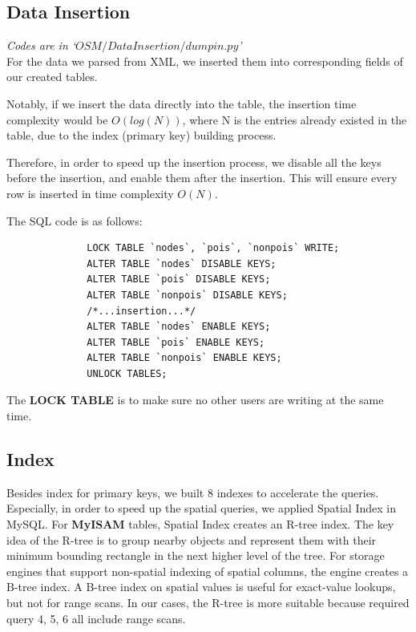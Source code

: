 \documentclass[final,1p,times]{elsarticle}
\begin{document}
\subsection{Data Insertion}
\emph{Codes are in `$OSM/DataInsertion/dumpin.py$'}\\

For the data we parsed from XML, we inserted them into corresponding fields of our created tables.

Notably, if we insert the data directly into the table, the insertion time complexity would be $O(log(N))$, where N is the entries already existed in the table, due to the index (primary key) building process.

Therefore, in order to speed up the insertion process, we disable all the keys before the insertion, and enable them after the insertion. This will ensure every row is inserted in time complexity $O(N)$.

The SQL code is as follows:

\begin{verbatim}
              LOCK TABLE `nodes`, `pois`, `nonpois` WRITE;
              ALTER TABLE `nodes` DISABLE KEYS;
              ALTER TABLE `pois` DISABLE KEYS;
              ALTER TABLE `nonpois` DISABLE KEYS;
              /*...insertion...*/
              ALTER TABLE `nodes` ENABLE KEYS;
              ALTER TABLE `pois` ENABLE KEYS;
              ALTER TABLE `nonpois` ENABLE KEYS;
              UNLOCK TABLES;
\end{verbatim}

The \textbf{LOCK TABLE} is to make sure no other users are writing at the same time.
\subsection{Index}
Besides index for primary keys, we built 8 indexes to accelerate the queries. Especially, in order to speed up the spatial queries, we applied Spatial Index in MySQL. For \textbf{MyISAM} tables, Spatial Index creates an R-tree index. The key idea of the R-tree is to group nearby objects and represent them with their minimum bounding rectangle in the next higher level of the tree. For storage engines that support non-spatial indexing of spatial columns, the engine creates a B-tree index. A B-tree index on spatial values is useful for exact-value lookups, but not for range scans. In our cases, the R-tree is more suitable because required query 4, 5, 6 all include range scans.
\end{document}

